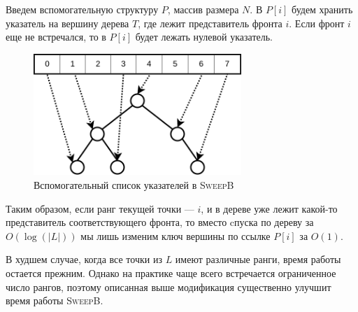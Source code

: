 Введем вспомогательную структуру $P$, массив размера $N$.
В $P[i]$ будем хранить указатель на вершину дерева $T$, где лежит представитель фронта $i$.
Если фронт $i$ еще не встречался, то в $P[i]$ будет лежать нулевой указатель.

\begin{figure}[h]
\centering
\includegraphics[width=0.7\textwidth]{images/sweep.png}
    \caption{Вспомогательный список указателей в \textsc{SweepB}}
\end{figure}

Таким образом, если ранг текущей точки --- $i$, и в дереве уже лежит какой-то представитель соответствующего фронта, то вместо cпуска по дереву за $O(\log(|L|))$ мы лишь изменим ключ вершины по ссылке $P[i]$ за $O(1)$.

В худшем случае, когда все точки из $L$ имеют различные ранги, время работы остается прежним.
Однако на практике чаще всего встречается ограниченное число рангов, поэтому описанная выше модификация существенно улучшит время работы \textsc{SweepB}.

